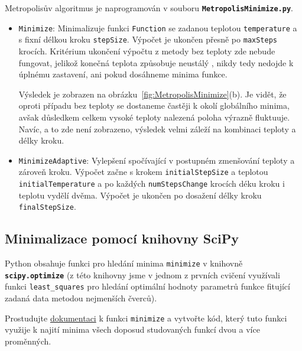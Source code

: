 \documentclass[a4paper,11pt,twoside]{article}
\def\code#1{\textnormal{\texttt{#1}}}
\def\file#1{\textnormal{\textbf{\texttt{#1}}}}
\begin{document}
\begin{solution}
            Metropolisův algoritmus je naprogramován v souboru \file{MetropolisMinimize.py}.
            \begin{itemize}
                \item \code{Minimize}: 
                    Minimalizuje funkci \code{Function} se zadanou teplotou \code{temperature} a s fixní délkou kroku \code{stepSize}. 
                    Výpočet je ukončen přesně po \code{maxSteps} krocích.
                    Kritérium ukončení výpočtu z metody bez teploty zde nebude fungovat, jelikož konečná teplota způsobuje neustálý , nikdy tedy nedojde k úplnému zastavení, ani pokud dosáhneme minima funkce.

                    Výsledek je zobrazen na obrázku~\ref{fig:MetropolisMinimize}(b).
                    Je vidět, že oproti případu bez teploty se dostaneme častěji k okolí globálního minima, avšak důsledkem celkem vysoké teploty nalezená poloha výrazně fluktuuje.
                    Navíc, a to zde není zobrazeno, výsledek velmi záleží na kombinaci teploty a délky kroku.
                    
                \item \code{MinimizeAdaptive}:
                    Vylepšení spočívající v postupném zmenšování teploty a zároveň kroku.
                    Výpočet začne s krokem \code{initialStepSize} a teplotou \code{initialTemperature} a po každých \code{numStepsChange} krocích déku kroku i teplotu vydělí dvěma.
                    Výpočet je ukončen po dosažení délky kroku \code{finalStepSize}.

            \end{itemize}
        \end{solution}

        \subsection{Minimalizace pomocí knihovny SciPy}
        Python obsahuje funkci pro hledání minima \code{minimize} v knihovně \file{scipy.optimize} 
        (z této knihovny jsme v jednom z prvních cvičení využívali funkci \code{least\_squares} pro hledání optimální hodnoty parametrů funkce fitující zadaná data metodou nejmenších čverců).
        
        \begin{task}
            Prostudujte \href{https://docs.scipy.org/doc/scipy/reference/generated/scipy.optimize.minimize.html}{dokumentaci} k funkci \code{minimize} a vytvořte kód, který tuto funkci využije k najití minima všech doposud studovaných funkcí dvou a více proměnných.
        \end{task}
\end{document}
